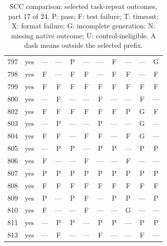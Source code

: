 \begin{table}[p]
\begin{tabular*}{\textwidth}{@{\extracolsep{\fill}}rc*{9}{c}@{}}
797 & yes & — & — & P & — & — & F & — & — & G\\
798 & yes & F & — & F & F & — & F & F & — & F\\
799 & yes & F & F & F & F & F & F & F & F & F\\
800 & yes & — & F & — & — & F & — & — & F & —\\
802 & yes & F & F & F & F & F & F & P & G & F\\
803 & yes & — & P & — & — & P & — & — & G & —\\
804 & yes & F & F & — & F & F & — & F & G & —\\
805 & yes & — & P & P & — & P & P & — & P & P\\
806 & yes & F & — & — & F & — & — & F & — & —\\
807 & yes & P & P & P & P & P & P & P & P & P\\
808 & yes & F & F & F & F & F & F & F & F & F\\
809 & yes & P & — & P & F & — & P & P & — & P\\
810 & yes & F & — & — & F & — & — & G & — & —\\
811 & yes & — & P & P & — & P & P & — & P & P\\
813 & yes & — & F & — & — & F & — & — & F & —\\
\bottomrule\end{tabular*}
\caption{SCC comparison: selected task-repeat outcomes, part 17 of 24. P: pass; F: test failure; T: timeout; X: format failure; G: incomplete generation; N: missing native outcome; U: control-ineligible. A dash means outside the selected prefix.}
\end{table}
\clearpage
